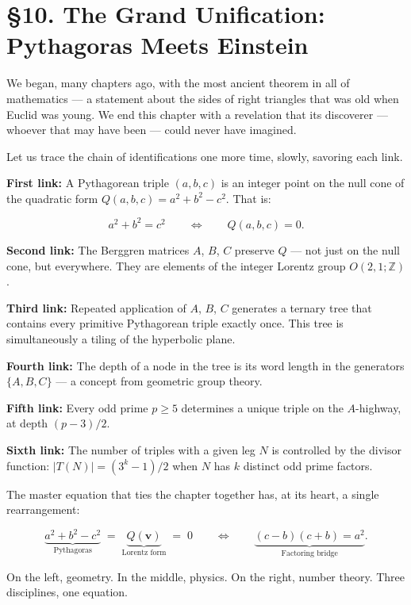 \section*{§10. The Grand Unification: Pythagoras Meets Einstein}


We began, many chapters ago, with the most ancient theorem in all of mathematics --- a statement about the sides of right triangles that was old when Euclid was young. We end this chapter with a revelation that its discoverer --- whoever that may have been --- could never have imagined.

Let us trace the chain of identifications one more time, slowly, savoring each link.

\textbf{First link:} A Pythagorean triple $(a, b, c)$ is an integer point on the null cone of the quadratic form $Q(a, b, c) = a^2 + b^2 - c^2$. That is:

\[a^2 + b^2 = c^2 \qquad\Longleftrightarrow\qquad Q(a, b, c) = 0.\]

\textbf{Second link:} The Berggren matrices $A$, $B$, $C$ preserve $Q$ --- not just on the null cone, but everywhere. They are elements of the integer Lorentz group $O(2,1; \mathbb{Z})$.

\textbf{Third link:} Repeated application of $A$, $B$, $C$ generates a ternary tree that contains every primitive Pythagorean triple exactly once. This tree is simultaneously a tiling of the hyperbolic plane.

\textbf{Fourth link:} The depth of a node in the tree is its word length in the generators $\{A, B, C\}$ --- a concept from geometric group theory.

\textbf{Fifth link:} Every odd prime $p \geq 5$ determines a unique triple on the $A$-highway, at depth $(p - 3)/2$.

\textbf{Sixth link:} The number of triples with a given leg $N$ is controlled by the divisor function: $|T(N)| = (3^k - 1)/2$ when $N$ has $k$ distinct odd prime factors.

The master equation that ties the chapter together has, at its heart, a single rearrangement:

\[\underbrace{a^2 + b^2 - c^2}_{\text{Pythagoras}} \;=\; \underbrace{Q(\mathbf{v})}_{\text{Lorentz form}} \;=\; 0 \qquad\Longleftrightarrow\qquad \underbrace{(c - b)(c + b) = a^2}_{\text{Factoring bridge}}.\]

On the left, geometry. In the middle, physics. On the right, number theory. Three disciplines, one equation.


